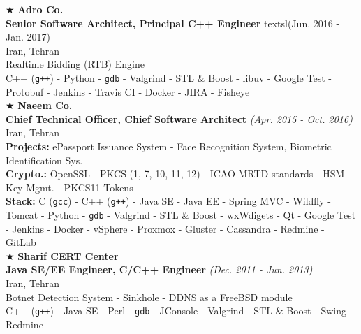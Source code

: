\documentclass[10pt,a4paper]{article}
\begin{document}
\noindent $\bigstar$ \hspace{0.1cm} \large \textbf{Adro Co.} \\
\indent \small \textbf{Senior Software Architect, Principal C++ Engineer} textsl{(Jun. 2016 - Jan. 2017)} \\
\indent \textnormal{Iran, Tehran} \\
\indent \textbullet \hspace{0.05cm} Realtime Bidding (RTB) Engine \\
\indent \textbullet \hspace{0.05cm} C++ (\texttt{g++}) - Python - \texttt{gdb} - Valgrind - STL \& Boost - libuv - Google Test - Protobuf - Jenkins - Travis CI - Docker - JIRA - Fisheye \\

\noindent $\bigstar$ \hspace{0.1cm} \large \textbf{Naeem Co.} \\
\indent \small \textbf{Chief Technical Officer, Chief Software Architect} \textsl{(Apr. 2015 - Oct. 2016)} \\
\indent \textnormal{Iran, Tehran} \\
\indent \textbullet \hspace{0.05cm} \textbf{Projects:} ePassport Issuance System - Face Recognition System, Biometric Identification Sys. \\
\indent \textbullet \hspace{0.05cm} \textbf{Crypto.:} OpenSSL - PKCS (1, 7, 10, 11, 12) - ICAO MRTD standards - HSM - Key Mgmt. - PKCS11 Tokens\\
\indent \textbullet \hspace{0.05cm} \textbf{Stack:} C (\texttt{gcc}) - C++ (\texttt{g++}) - Java SE - Java EE - Spring MVC - Wildfly - Tomcat - Python - \texttt{gdb} - Valgrind - STL \& Boost - wxWdigets - Qt - Google Test - Jenkins - Docker - vSphere - Proxmox - Gluster - Cassandra - Redmine - GitLab \\


\noindent $\bigstar$ \hspace{0.1cm} \large \textbf{Sharif CERT Center} \\ 
\indent \small \textbf{Java SE/EE Engineer, C/C++ Engineer} \textsl{(Dec. 2011 - Jun. 2013)} \\
\indent \textnormal{Iran, Tehran} \\ 
\indent \textbullet \hspace{0.05cm} Botnet Detection System - Sinkhole - DDNS as a FreeBSD module \\
\indent \textbullet \hspace{0.05cm} C++ (\texttt{g++}) - Java SE - Perl - \texttt{gdb} - JConsole - Valgrind - STL \& Boost - Swing - Redmine \\
\end{document}

